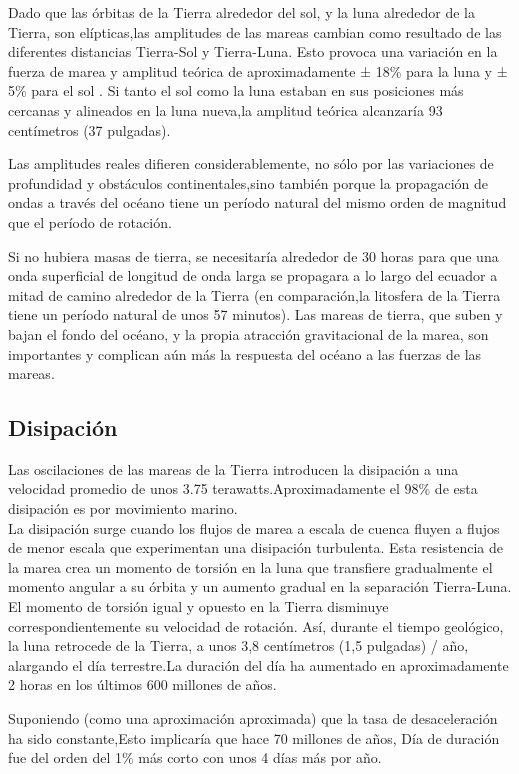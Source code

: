 \documentclass[12pt]{article}
\begin{document}
Dado que las órbitas de la Tierra alrededor del sol, y la luna alrededor de la Tierra, son elípticas,las amplitudes de las mareas cambian como resultado de las diferentes distancias Tierra-Sol y Tierra-Luna. Esto provoca una variación en la fuerza de marea y amplitud teórica de aproximadamente ± 18\% para la luna y ± 5\% para el sol . Si tanto el sol como la luna estaban en sus posiciones más cercanas y alineados en la luna nueva,la amplitud teórica alcanzaría 93 centímetros (37 pulgadas).




Las amplitudes reales difieren considerablemente, no sólo por las variaciones de profundidad y obstáculos continentales,sino también porque la propagación de ondas a través del océano tiene un período natural del mismo orden de magnitud que el período de rotación.

Si no hubiera masas de tierra, se necesitaría alrededor de 30 horas para que una onda superficial de longitud de onda larga se propagara a lo largo del ecuador a mitad de camino alrededor de la Tierra (en comparación,la litosfera de la Tierra tiene un período natural de unos 57 minutos).
Las mareas de tierra, que suben y bajan el fondo del océano, y la propia atracción gravitacional de la marea, son importantes y complican aún más la respuesta del océano a las fuerzas de las mareas.

\subsection*{Disipación}

Las oscilaciones de las mareas de la Tierra introducen la disipación a una velocidad promedio de unos 3.75 terawatts.Aproximadamente el 98\% de esta disipación es por movimiento marino.\\ La disipación surge cuando los flujos de marea a escala de cuenca fluyen a flujos de menor escala que experimentan una disipación turbulenta. Esta resistencia de la marea crea un momento de torsión en la luna que transfiere gradualmente el momento angular a su órbita y un aumento gradual en la separación Tierra-Luna. El momento de torsión igual y opuesto en la Tierra disminuye correspondientemente su velocidad de rotación. Así, durante el tiempo geológico, la luna retrocede de la Tierra, a unos 3,8 centímetros (1,5 pulgadas) / año, alargando el día terrestre.La duración del día ha aumentado en aproximadamente 2 horas en los últimos 600 millones de años.

Suponiendo (como una aproximación aproximada) que la tasa de desaceleración ha sido constante,Esto implicaría que hace 70 millones de años, Día de duración fue del orden del 1\% más corto con unos 4 días más por año.
\end{document}
